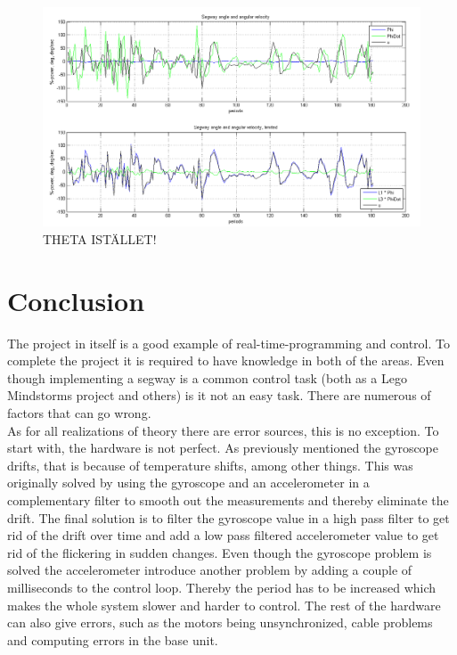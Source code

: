 \documentclass[a4paper]{article}
\begin{document}
\begin{figure}[H]
  \centering
\includegraphics[scale=0.47]{pic/feedbackPlot.png}
\caption{THETA ISTÄLLET!}
\end{figure}

\section{Conclusion}
The project in itself is a good example of real-time-programming and control. To complete the project it is required to have knowledge in both of the areas. Even though implementing a segway is a common control task (both as a Lego Mindstorms project and others) is it not an easy task. There are numerous of factors that can go wrong.\\

As for all realizations of theory there are error sources, this is no exception. To start with, the hardware is not perfect. As previously mentioned the gyroscope drifts, that is because of temperature shifts, among other things. This was originally solved by using the gyroscope and an accelerometer in a complementary filter to smooth out the measurements and thereby eliminate the drift. The final solution is to filter the gyroscope value in a high pass filter to get rid of the drift over time and add a low pass filtered accelerometer value to get rid of the flickering in sudden changes. Even though the gyroscope problem is solved the accelerometer introduce another problem by adding a couple of milliseconds to the control loop. Thereby the period has to be increased which makes the whole system slower and harder to control. The rest of the hardware can also give errors, such as the motors being unsynchronized, cable problems and computing errors in the base unit\cite{filter}.\\
\end{document}
